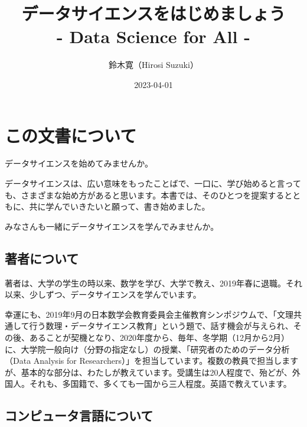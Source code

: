 \documentclass[
]{bxjsbook}
\title{データサイエンスをはじめましょう\\
- Data Science for All -}
\author{鈴木寛（Hirosi Suzuki）}
\date{2023-04-01}
\theoremstyle{definition}
\theoremstyle{definition}
\theoremstyle{definition}
\theoremstyle{definition}
\theoremstyle{remark}
\begin{document}
\maketitle

{
\setcounter{tocdepth}{2}
\tableofcontents
}
\hypertarget{ux3053ux306eux6587ux66f8ux306bux3064ux3044ux3066}{%
\section*{この文書について}\label{ux3053ux306eux6587ux66f8ux306bux3064ux3044ux3066}}

データサイエンスを始めてみませんか。

データサイエンスは、広い意味をもったことばで、一口に、学び始めると言っても、さまざまな始め方があると思います。本書では、そのひとつを提案するとともに、共に学んでいきたいと願って、書き始めました。

みなさんも一緒にデータサイエンスを学んでみませんか。

\hypertarget{ux8457ux8005ux306bux3064ux3044ux3066}{%
\subsection*{著者について}\label{ux8457ux8005ux306bux3064ux3044ux3066}}

著者は、大学の学生の時以来、数学を学び、大学で教え、2019年春に退職。それ以来、少しずつ、データサイエンスを学んでいます。

幸運にも、2019年9月の日本数学会教育委員会主催教育シンポジウムで、「文理共通して行う数理・データサイエンス教育」という題で、話す機会が与えられ、その後、あることが契機となり、2020年度から、毎年、冬学期（12月から2月）に、大学院一般向け（分野の指定なし）の授業、「研究者のためのデータ分析（Data Analysis for Researchers）」を担当しています。複数の教員で担当しますが、基本的な部分は、わたしが教えています。受講生は20人程度で、殆どが、外国人。それも、多国籍で、多くても一国から三人程度。英語で教えています。

\hypertarget{ux30b3ux30f3ux30d4ux30e5ux30fcux30bfux8a00ux8a9eux306bux3064ux3044ux3066}{%
\subsection*{コンピュータ言語について}\label{ux30b3ux30f3ux30d4ux30e5ux30fcux30bfux8a00ux8a9eux306bux3064ux3044ux3066}}
\end{document}
